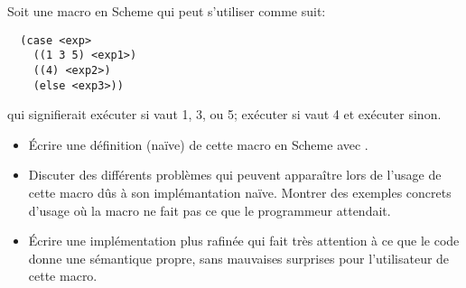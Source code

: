 \begin{Exercise}[title={Macro case}]
Soit une macro  en Scheme qui peut s'utiliser comme suit:
\begin{verbatim}
  (case <exp>
    ((1 3 5) <exp1>)
    ((4) <exp2>)
    (else <exp3>))
\end{verbatim}
qui signifierait exécuter  si  vaut 1, 3, ou 5;
exécuter  si  vaut 4 et exécuter  sinon.

\begin{itemize}
\item Écrire une définition (naïve) de cette macro en Scheme avec
  .

\item Discuter des différents problèmes qui peuvent apparaître lors de
  l'usage de cette macro dûs à son implémantation naïve.  Montrer des
  exemples concrets d'usage où la macro ne fait pas ce que le
  programmeur attendait.

\item Écrire une implémentation plus rafinée qui fait très attention à ce
  que le code donne une sémantique propre, sans mauvaises surprises pour
  l'utilisateur de cette macro.
\end{itemize}
\end{Exercise}